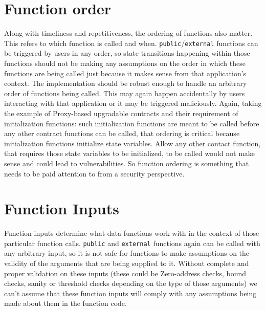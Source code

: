\section{Function order}
Along with timeliness and repetitiveness, the ordering of functions also matter. This refers to which function is called and when. \verb|public|/\verb|external| functions can be triggered by users in any order, so state transitions happening within those functions should not be making any assumptions on the order in which these functions are being called just because it makes sense from that application's context. The implementation should be robust enough to handle an arbitrary order of functions being called. This may again happen accidentally by users interacting with that application or it may be triggered maliciously. Again, taking the example of Proxy-based upgradable contracts and their requirement of initialization functions: such initialization functions are meant to be called before any other contract functions can be called, that ordering is critical because initialization functions initialize state variables. Allow any other contact function, that requires those state variables to be initialized, to be called would not make sense and could lead to vulnerabilities. So function ordering is something that needs to be paid attention to from a security perspective.

\section{Function Inputs}
Function inputs determine what data functions work with in the context of those particular function calls. \verb|public| and \verb|external| functions again can be called with any arbitrary input, so it is not safe for functions to make assumptions on the validity of the arguments that are being supplied to it. Without complete and proper validation on these inputs (these could be Zero-address checks, bound checks, sanity or threshold checks depending on the type of those arguments) we can't assume that these function inputs will comply with any assumptions being made about them in the function code.


